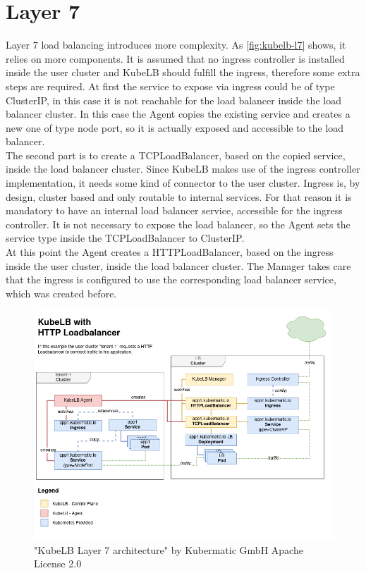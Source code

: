 \section{Layer 7}

Layer 7 load balancing introduces more complexity.
As \autoref{fig:kubelb-l7} shows, it relies on more components.
It is assumed that no ingress controller is installed inside the user cluster and KubeLB should fulfill the ingress, therefore some extra steps are required.
At first the service to expose via ingress could be of type ClusterIP, in this case it is not reachable for the load balancer inside the load balancer cluster.
In this case the Agent copies the existing service and creates a new one of type node port, so it is actually exposed and accessible to the load balancer.
\\
The second part is to create a TCPLoadBalancer, based on the copied service, inside the load balancer cluster.
Since KubeLB makes use of the ingress controller implementation, it needs some kind of connector to the user cluster.
Ingress is, by design, cluster based and only routable to internal services.
For that reason it is mandatory to have an internal load balancer service, accessible for the ingress controller.
It is not necessary to expose the load balancer, so the Agent sets the service type inside the TCPLoadBalancer to ClusterIP.
\\
At this point the Agent creates a HTTPLoadBalancer, based on the ingress inside the user cluster, inside the load balancer cluster.
The Manager takes care that the ingress is configured to use the corresponding load balancer service, which was created before.

\begin{figure}[H]
    \centering
    \includegraphics[width=1\linewidth]{media/06/kubelb-l7}
    \caption{"KubeLB Layer 7 architecture" by Kubermatic GmbH Apache License 2.0}
    \label{fig:kubelb-l7}
\end{figure}

